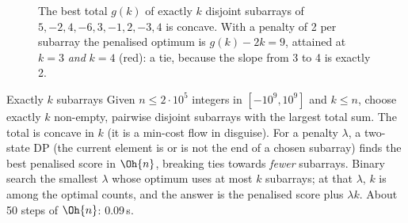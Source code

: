 \begin{figure}[htbp]
\centering
{}
\caption{The best total $g(k)$ of exactly $k$ disjoint subarrays of $5, -2, 4, -6, 3, -1, 2, -3, 4$ is concave. With a penalty of 2 per
subarray the penalised optimum is $g(k) - 2k = 9$, attained at $k = 3$ \emph{and} $k = 4$ (red): a tie, because the slope from 3 to 4
is exactly 2.}
\label{fig:aliens}
\end{figure}

\begin{problem}{Exactly $k$ subarrays}
Given $n \le 2 \cdot 10^5$ integers in $[-10^9, 10^9]$ and $k \le n$, choose exactly $k$ non-empty, pairwise disjoint subarrays with the
largest total sum.
\solution The total is concave in $k$ (it is a min-cost flow in disguise). For a penalty $\lambda$, a two-state DP (the current
element is or is not the end of a chosen subarray) finds the best penalised score in $\Oh{n}$, breaking ties towards \emph{fewer}
subarrays. Binary search the smallest $\lambda$ whose optimum uses at most $k$ subarrays; at that $\lambda$, $k$ is among the optimal
counts, and the answer is the penalised score plus $\lambda k$. About 50 steps of $\Oh{n}$: 0.09\,s.
\end{problem}

